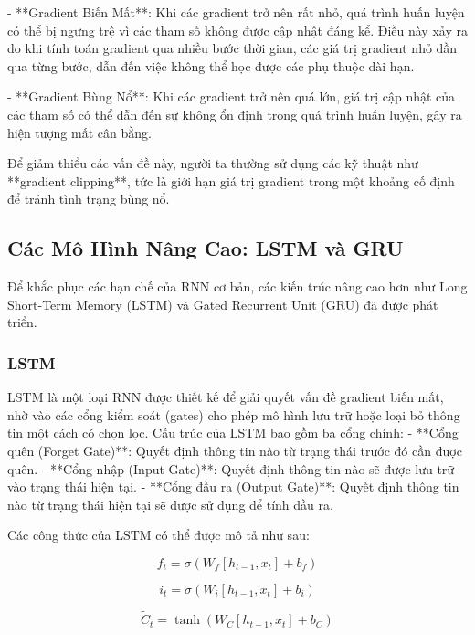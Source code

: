 - **Gradient Biến Mất**: Khi các gradient trở nên rất nhỏ, quá trình huấn luyện có thể bị ngưng trệ vì các tham số không được cập nhật đáng kể. Điều này xảy ra do khi tính toán gradient qua nhiều bước thời gian, các giá trị gradient nhỏ dần qua từng bước, dẫn đến việc không thể học được các phụ thuộc dài hạn.

- **Gradient Bùng Nổ**: Khi các gradient trở nên quá lớn, giá trị cập nhật của các tham số có thể dẫn đến sự không ổn định trong quá trình huấn luyện, gây ra hiện tượng mất cân bằng.

Để giảm thiểu các vấn đề này, người ta thường sử dụng các kỹ thuật như **gradient clipping**, tức là giới hạn giá trị gradient trong một khoảng cố định để tránh tình trạng bùng nổ.

\subsection{Các Mô Hình Nâng Cao: LSTM và GRU}

Để khắc phục các hạn chế của RNN cơ bản, các kiến trúc nâng cao hơn như Long Short-Term Memory (LSTM) và Gated Recurrent Unit (GRU) đã được phát triển. 

\subsubsection{LSTM}

LSTM là một loại RNN được thiết kế để giải quyết vấn đề gradient biến mất, nhờ vào các cổng kiểm soát (gates) cho phép mô hình lưu trữ hoặc loại bỏ thông tin một cách có chọn lọc. Cấu trúc của LSTM bao gồm ba cổng chính:
- **Cổng quên (Forget Gate)**: Quyết định thông tin nào từ trạng thái trước đó cần được quên.
- **Cổng nhập (Input Gate)**: Quyết định thông tin nào sẽ được lưu trữ vào trạng thái hiện tại.
- **Cổng đầu ra (Output Gate)**: Quyết định thông tin nào từ trạng thái hiện tại sẽ được sử dụng để tính đầu ra.

Các công thức của LSTM có thể được mô tả như sau:

\begin{equation}
    f_t = \sigma(W_f [h_{t-1}, x_t] + b_f)
\end{equation}

\begin{equation}
    i_t = \sigma(W_i [h_{t-1}, x_t] + b_i)
\end{equation}

\begin{equation}
    \tilde{C}_t = \tanh(W_C [h_{t-1}, x_t] + b_C)
\end{equation}

